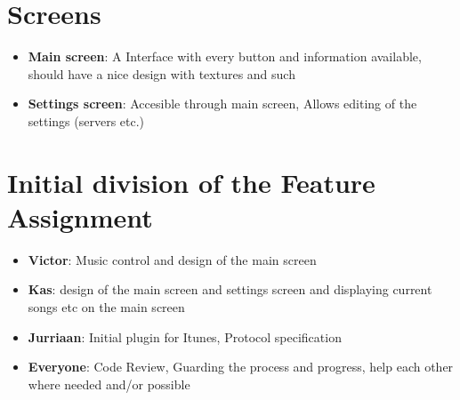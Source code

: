 \documentclass[a4paper, 13pt]{article}
\begin{document}
\section*{Screens}
    \begin{itemize}
     \item \textbf{Main screen}: A Interface with every button and information
     available, should have a nice design with textures and such
     \item \textbf{Settings screen}: Accesible through main screen, Allows
     editing of the settings (servers etc.)
    \end{itemize}
    
\section*{Initial division of the Feature Assignment}
    \begin{itemize}
     \item \textbf{Victor}: Music control and design of the main screen
     \item \textbf{Kas}: design of the main screen and settings screen and
     displaying current songs etc on the main screen
     \item \textbf{Jurriaan}: Initial plugin for Itunes, Protocol specification

     \item \textbf{Everyone}: Code Review, Guarding the process and progress,
     help each other where needed and/or possible
    \end{itemize}
\end{document}
